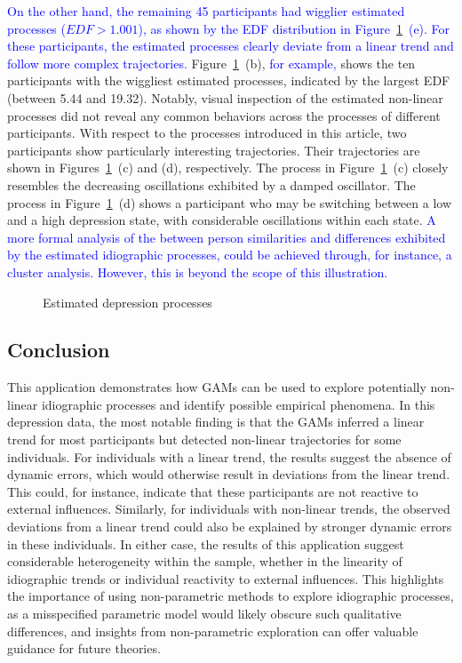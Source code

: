 \documentclass[man, floatsintext]{apa7}
\begin{document}
\textcolor{blue}{ On the other hand, the remaining 45 participants had wigglier
  estimated processes ($EDF > 1.001$), as shown by the EDF distribution in
  Figure~\ref{fig:dem_smooth}~(e). For these participants, the estimated
  processes clearly deviate from a linear trend and follow more complex
  trajectories. } Figure~\ref{fig:dem_smooth}~(b), \textcolor{blue}{for
  example,} shows the ten participants with the wiggliest estimated processes,
indicated by the largest EDF (between 5.44 and 19.32). Notably, visual
inspection of the estimated non-linear processes did not reveal any common
behaviors across the processes of different participants. With respect to the
processes introduced in this article, two participants show particularly
interesting trajectories. Their trajectories are shown in
Figures~\ref{fig:dem_smooth}~(c) and (d), respectively. The process in
Figure~\ref{fig:dem_smooth}~(c) closely resembles the decreasing oscillations
exhibited by a damped oscillator. The process in
Figure~\ref{fig:dem_smooth}~(d) shows a participant who may be switching
between a low and a high depression state, with considerable oscillations
within each state. \textcolor{blue}{A more formal analysis of the between
  person similarities and differences exhibited by the estimated idiographic
  processes, could be achieved through, for instance, a cluster analysis.
  However, this is beyond the scope of this illustration. }

\begin{figure}[!t]
  \caption{Estimated depression processes}
  \label{fig:dem_smooth}
\end{figure}

\subsection{Conclusion}

This application demonstrates how GAMs can be used to explore potentially
non-linear idiographic processes and identify possible empirical phenomena. In
this depression data, the most notable finding is that the GAMs inferred a
linear trend for most participants but detected non-linear trajectories for
some individuals. For individuals with a linear trend, the results suggest the
absence of dynamic errors, which would otherwise result in deviations from the
linear trend. This could, for instance, indicate that these participants are
not reactive to external influences. Similarly, for individuals with non-linear
trends, the observed deviations from a linear trend could also be explained by
stronger dynamic errors in these individuals. In either case, the results of
this application suggest considerable heterogeneity within the sample, whether
in the linearity of idiographic trends or individual reactivity to external
influences. This highlights the importance of using non-parametric methods to
explore idiographic processes, as a misspecified parametric model would likely
obscure such qualitative differences, and insights from non-parametric
exploration can offer valuable guidance for future theories.
\end{document}
